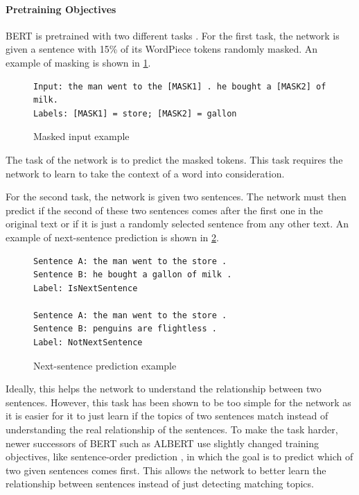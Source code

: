 \paragraph{Pretraining Objectives}

BERT is pretrained with two different tasks \cite[p.~4--5]{devlin2018bert}.
For the first task, the network is given a sentence with 15\% of its WordPiece tokens randomly masked.
An example of masking is shown in \cref{fig:bert_masking_example}.

\begin{figure}[h]
\begin{lstlisting}[numbers=none]
Input: the man went to the [MASK1] . he bought a [MASK2] of milk.
Labels: [MASK1] = store; [MASK2] = gallon
\end{lstlisting}
\caption[Masked input example]{Masked input example \cite{bertGithub}}
\label{fig:bert_masking_example}
\end{figure}

The task of the network is to predict the masked tokens.
This task requires the network to learn to take the context of a word into consideration.

For the second task, the network is given two sentences.
The network must then predict if the second of these two sentences comes after the first one in the original text or if it is just a randomly selected sentence from any other text.
An example of next-sentence prediction is shown in \cref{fig:bert_next_sentence_example}.

\begin{figure}[h]
\begin{lstlisting}[numbers=none]
Sentence A: the man went to the store .
Sentence B: he bought a gallon of milk .
Label: IsNextSentence

Sentence A: the man went to the store .
Sentence B: penguins are flightless .
Label: NotNextSentence
\end{lstlisting}
\caption[Next-sentence prediction example]{Next-sentence prediction example \cite{bertGithub}}
\label{fig:bert_next_sentence_example}
\end{figure}

Ideally, this helps the network to understand the relationship between two sentences.
However, this task has been shown to be too simple for the network as it is easier for it to just learn if the topics of two sentences match instead of understanding the real relationship of the sentences.
To make the task harder, newer successors of BERT such as ALBERT use slightly changed training objectives, like sentence-order prediction \cite[p.~3]{1909.11942}, in which the goal is to predict which of two given sentences comes first.
This allows the network to better learn the relationship between sentences instead of just detecting matching topics.

